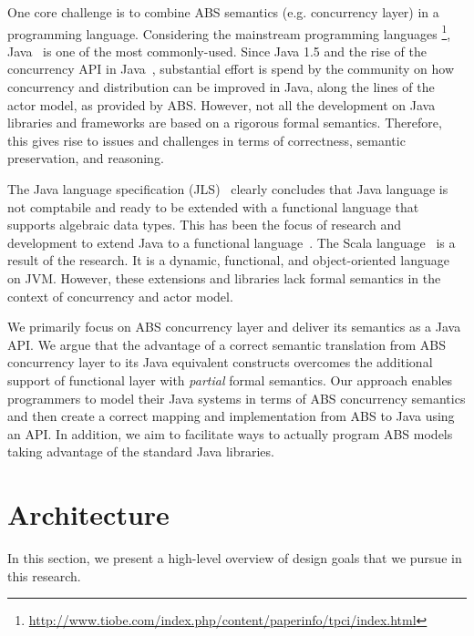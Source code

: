 One core challenge is to combine ABS semantics (e.g. concurrency layer) in a
programming language.
Considering the mainstream programming languages
\footnote{\url{http://www.tiobe.com/index.php/content/paperinfo/tpci/index.html}}, Java~\cite{gosling2000java} is one of the most commonly-used.
Since Java 1.5 and the rise of the concurrency API in Java~\cite{jsr166}, substantial effort is spend by the community on how concurrency and distribution can be improved in Java, along the lines of the actor model, as provided by ABS.
However, not all the development on Java libraries and frameworks are based on a rigorous formal semantics. 
Therefore, this gives rise to issues and challenges in terms of correctness, semantic preservation, and reasoning.

The Java language specification (JLS)~\cite{gosling2000java} clearly concludes that Java language is not comptabile and ready to be extended with a functional language that supports algebraic data types.
This has been the focus of research and development to extend Java to a functional language~\cite{odersky1997pizza,henkel2003discovering,nystrom2003polyglot,bracha1998making}.
The Scala language~\cite{odersky2004scala} is a result of the research. It is a dynamic, functional, and object-oriented language on JVM.
However, these extensions and libraries lack formal semantics in the context
of concurrency and actor model.

We primarily focus on ABS concurrency layer and deliver its semantics as a Java API.
We argue that the advantage of a correct semantic translation from ABS concurrency layer to its Java equivalent constructs overcomes the additional support of functional layer with \emph{partial} formal semantics.
Our approach enables programmers to model their Java systems in terms of ABS concurrency semantics and then create a correct mapping and implementation from ABS to Java using an API.
In addition, we aim to facilitate ways to actually program ABS models taking advantage of the standard Java libraries.

\section{Architecture}
\label{sec:intro:arch:crit}

In this section, we present a high-level overview of design goals that we pursue in this research. 

